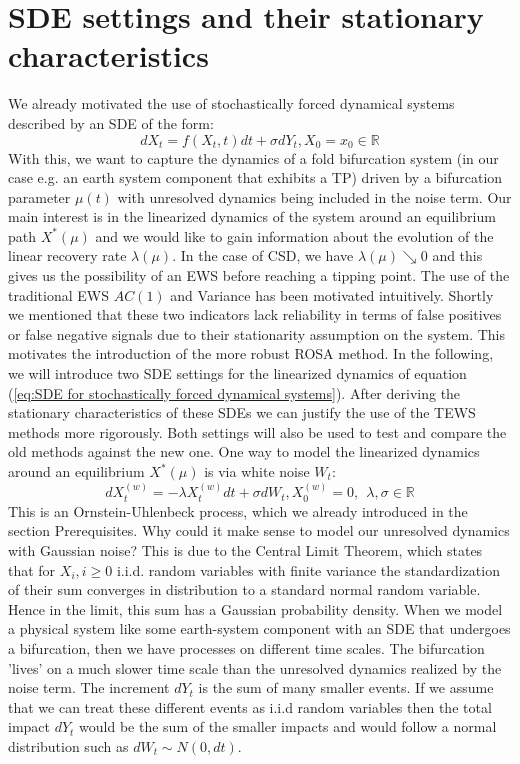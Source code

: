 \documentclass[%
thesis=student,%
coverpage=false,%
titlepage=false,%
headmarks=true, %
english,%
font=libertine, %
math=newpxtx, %
BCOR=5mm,%
coverBCOR=11mm%
]{tumbook}
\begin{document}
\chapter{SDE settings and their stationary characteristics}

We already motivated the use of stochastically forced dynamical systems described by an SDE of the form:
\begin{equation}
    dX_{t} = f(X_{t},t)dt + \sigma dY_{t}, X_{0} = x_{0} \in \mathbb{R}
    \label{eq:SDE for stochastically forced dynamical systems}
\end{equation}
With this, we want to capture the dynamics of a fold bifurcation system (in our case e.g. an earth system component that exhibits a TP) driven by a bifurcation parameter $\mu(t)$ with unresolved dynamics being included in the noise term. Our main interest is in the linearized dynamics of the system around an equilibrium path $X^{*}(\mu)$ and we would like to gain information about the evolution of the linear recovery rate $\lambda(\mu)$. In the case of CSD, we have $\lambda(\mu) \searrow 0$ and this gives us the possibility of an EWS before reaching a tipping point. The use of the traditional EWS $AC(1)$ and Variance has been motivated intuitively. Shortly we mentioned that these two indicators lack reliability in terms of false positives or false negative signals due to their stationarity assumption on the system. This motivates the introduction of the more robust ROSA method. 
In the following, we will introduce two SDE settings for the linearized dynamics of equation (\ref{eq:SDE for stochastically forced dynamical systems}). 
After deriving the stationary characteristics of these SDEs we can justify the use of the TEWS methods more rigorously. Both settings will also be used to test and compare the old methods against the new one.
One way to model the linearized dynamics around an equilibrium $X^{*}(\mu)$ is via white noise $W_{t}$:
\begin{equation}
        dX_{t}^{(w)} = -\lambda X_{t}^{(w)}dt + \sigma dW_{t}, X_{0}^{(w)} = 0, \ \ \lambda,\sigma \in \mathbb{R}
        \label{eq: white noise linearized SDE}
\end{equation}
This is an Ornstein-Uhlenbeck process, which we already introduced in the section Prerequisites. Why could it make sense to model our unresolved dynamics with Gaussian noise? This is due to the Central Limit Theorem, which states that for $X_{i}, i \geq 0$ i.i.d. random variables with finite variance the standardization of their sum converges in distribution to a standard normal random variable. Hence in the limit, this sum has a Gaussian probability density. When we model a physical system like some earth-system component with an SDE that undergoes a bifurcation, then we have processes on different time scales. The bifurcation 'lives' on a much slower time scale than the unresolved dynamics realized by the noise term. The increment $dY_{t}$ is the sum of many smaller events. If we assume that we can treat these different events as i.i.d random variables then the total impact $dY_{t}$ would be the sum of the smaller impacts and would follow a normal distribution such as $dW_{t} \sim N(0,dt)$. \cite{Kurt:2010} \\
\end{document}
